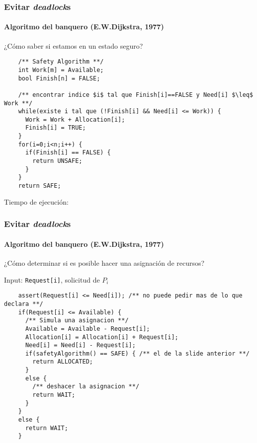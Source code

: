 \documentclass[letter]{beamer}
\begin{document}
\begin{frame}[fragile]
  \frametitle{Evitar {\em deadlock}s}
  \framesubtitle{Algoritmo del banquero (E.W.Dijkstra, 1977)}

  ¿Cómo saber si estamos en un estado seguro?
  
  \begin{verbatim}
    /** Safety Algorithm **/
    int Work[m] = Available;
    bool Finish[n] = FALSE;
    
    /** encontrar indice $i$ tal que Finish[i]==FALSE y Need[i] $\leq$ Work **/
    while(existe i tal que (!Finish[i] && Need[i] <= Work)) {
      Work = Work + Allocation[i];
      Finish[i] = TRUE;
    }
    for(i=0;i<n;i++) {
      if(Finish[i] == FALSE) {
        return UNSAFE;
      }
    }
    return SAFE;
  \end{verbatim}
  
  Tiempo de ejecución: 
  
\end{frame}

\begin{frame}[fragile]
  \frametitle{Evitar {\em deadlock}s}
  \framesubtitle{Algoritmo del banquero (E.W.Dijkstra, 1977)}

  ¿Cómo determinar si es posible hacer una asignación de recursos?
  
  Input: {\tt Request[i]}, solicitud de $P_i$
  \begin{verbatim}
    assert(Request[i] <= Need[i]); /** no puede pedir mas de lo que declara **/
    if(Request[i] <= Available) {
      /** Simula una asignacion **/
      Available = Available - Request[i];
      Allocation[i] = Allocation[i] + Request[i];
      Need[i] = Need[i] - Request[i];
      if(safetyAlgorithm() == SAFE) { /** el de la slide anterior **/
        return ALLOCATED;
      }
      else {
        /** deshacer la asignacion **/
        return WAIT;
      }
    }
    else {
      return WAIT;
    }
  \end{verbatim}
\end{frame}
\end{document}
